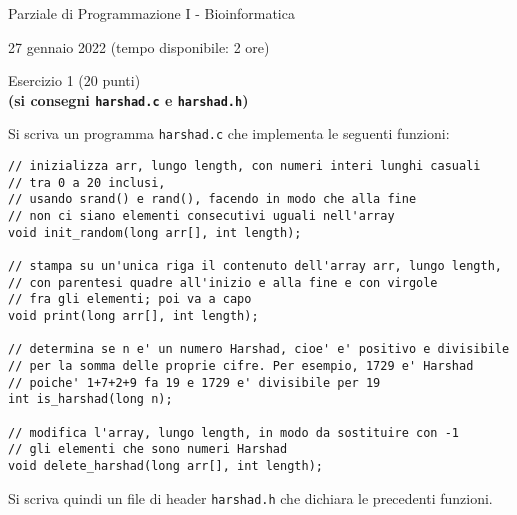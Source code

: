 \documentclass[12pt]{article}
\begin{document}
\begin{center}{\LARGE Parziale di Programmazione I - Bioinformatica}\\
\begin{center}
  \large 27 gennaio 2022 (tempo disponibile: 2 ore)
\end{center}
\end{center}

\begin{center}{\Large Esercizio 1} ($20$ punti)\\
  \textbf{(si consegni \texttt{harshad.c} e \texttt{harshad.h})}
\end{center}
Si scriva un programma \texttt{harshad.c} che implementa le seguenti funzioni:
\begin{center}
\begin{lstlisting}[language=myC]
// inizializza arr, lungo length, con numeri interi lunghi casuali
// tra 0 a 20 inclusi,
// usando srand() e rand(), facendo in modo che alla fine
// non ci siano elementi consecutivi uguali nell'array
void init_random(long arr[], int length);

// stampa su un'unica riga il contenuto dell'array arr, lungo length,
// con parentesi quadre all'inizio e alla fine e con virgole
// fra gli elementi; poi va a capo
void print(long arr[], int length);

// determina se n e' un numero Harshad, cioe' e' positivo e divisibile
// per la somma delle proprie cifre. Per esempio, 1729 e' Harshad
// poiche' 1+7+2+9 fa 19 e 1729 e' divisibile per 19
int is_harshad(long n);

// modifica l'array, lungo length, in modo da sostituire con -1
// gli elementi che sono numeri Harshad
void delete_harshad(long arr[], int length);
\end{lstlisting}
\end{center}
%
Si scriva quindi un file di header \texttt{harshad.h} che dichiara le precedenti funzioni.
\end{document}

